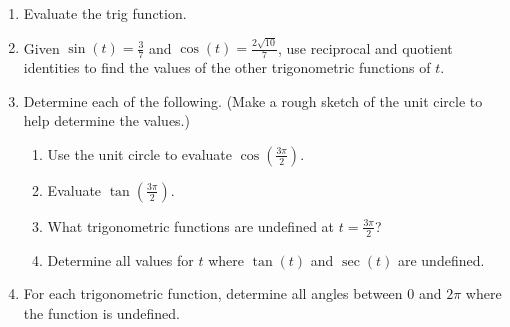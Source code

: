 \begin{enumerate}
\bigskip

\item Evaluate the trig function.
\begin{enumerate}[itemsep=5em]
\end{enumerate}

\bigskip

\item Given $\sin(t)=\frac{3}{7}$ and $\cos(t)=\frac{2\sqrt{10}}{7}$,
  use reciprocal and quotient identities to find the values of the
  other trigonometric functions of $t$.

  \vfill

  \clearpage
  

\item Determine each of the following. (Make a rough sketch of the unit
  circle to help determine the values.)
  \begin{enumerate} 
  \item Use the unit circle to evaluate $\displaystyle \cos\left(\frac{3\pi}{2}\right)$.

  \vfill
  
\item Evaluate $\displaystyle \tan\left(\frac{3\pi}{2}\right)$.

  \vfill
  
\item What trigonometric functions are undefined at
  $\displaystyle t= \frac{3\pi}{2}$?

  \vfill
  
\item Determine all values for $t$ where $\tan(t)$ and $\sec(t)$ are undefined.

  \vfill
  
\end{enumerate}

\item For each trigonometric function, determine all angles between 0
  and $2\pi$ where the function is undefined.


\end{enumerate}
